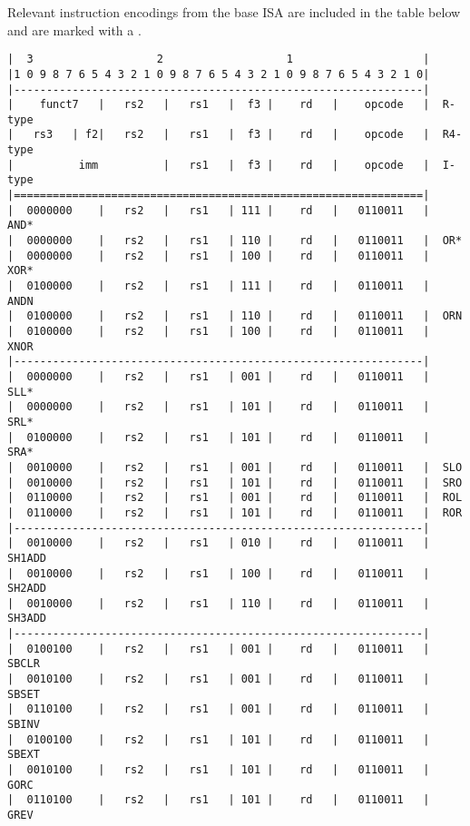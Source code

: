 Relevant instruction encodings from the base ISA are included in the table below
and are marked with a {\tt *}.


\begin{minipage}{\linewidth}
\begin{verbatim}
|  3                   2                   1                    |
|1 0 9 8 7 6 5 4 3 2 1 0 9 8 7 6 5 4 3 2 1 0 9 8 7 6 5 4 3 2 1 0|
|---------------------------------------------------------------|
|    funct7   |   rs2   |   rs1   |  f3 |    rd   |    opcode   |  R-type
|   rs3   | f2|   rs2   |   rs1   |  f3 |    rd   |    opcode   |  R4-type
|          imm          |   rs1   |  f3 |    rd   |    opcode   |  I-type
|===============================================================|
|  0000000    |   rs2   |   rs1   | 111 |    rd   |   0110011   |  AND*
|  0000000    |   rs2   |   rs1   | 110 |    rd   |   0110011   |  OR*
|  0000000    |   rs2   |   rs1   | 100 |    rd   |   0110011   |  XOR*
|  0100000    |   rs2   |   rs1   | 111 |    rd   |   0110011   |  ANDN
|  0100000    |   rs2   |   rs1   | 110 |    rd   |   0110011   |  ORN
|  0100000    |   rs2   |   rs1   | 100 |    rd   |   0110011   |  XNOR
|---------------------------------------------------------------|
|  0000000    |   rs2   |   rs1   | 001 |    rd   |   0110011   |  SLL*
|  0000000    |   rs2   |   rs1   | 101 |    rd   |   0110011   |  SRL*
|  0100000    |   rs2   |   rs1   | 101 |    rd   |   0110011   |  SRA*
|  0010000    |   rs2   |   rs1   | 001 |    rd   |   0110011   |  SLO
|  0010000    |   rs2   |   rs1   | 101 |    rd   |   0110011   |  SRO
|  0110000    |   rs2   |   rs1   | 001 |    rd   |   0110011   |  ROL
|  0110000    |   rs2   |   rs1   | 101 |    rd   |   0110011   |  ROR
|---------------------------------------------------------------|
|  0010000    |   rs2   |   rs1   | 010 |    rd   |   0110011   |  SH1ADD
|  0010000    |   rs2   |   rs1   | 100 |    rd   |   0110011   |  SH2ADD
|  0010000    |   rs2   |   rs1   | 110 |    rd   |   0110011   |  SH3ADD
|---------------------------------------------------------------|
|  0100100    |   rs2   |   rs1   | 001 |    rd   |   0110011   |  SBCLR
|  0010100    |   rs2   |   rs1   | 001 |    rd   |   0110011   |  SBSET
|  0110100    |   rs2   |   rs1   | 001 |    rd   |   0110011   |  SBINV
|  0100100    |   rs2   |   rs1   | 101 |    rd   |   0110011   |  SBEXT
|  0010100    |   rs2   |   rs1   | 101 |    rd   |   0110011   |  GORC
|  0110100    |   rs2   |   rs1   | 101 |    rd   |   0110011   |  GREV

\end{verbatim}
\end{minipage}
